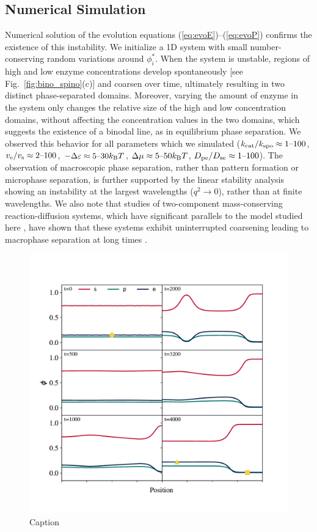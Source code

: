 \subsection{Numerical Simulation}

Numerical solution of the evolution equations (\ref{eq:evoE})--(\ref{eq:evoP}) confirms the existence of this instability. We initialize a 1D system
with small number-conserving random variations around $\phi_i^*$. When the system is unstable, regions of high and low enzyme concentrations develop spontaneously [see Fig.~\ref{fig:bino_spino}(c)] and coarsen over time, ultimately resulting in two distinct phase-separated domains. Moreover, varying the amount of enzyme in the system only changes the relative size of the high and low concentration domains, without affecting the concentration values in the two domains, which suggests the existence of a binodal line, as in equilibrium phase separation. We observed this behavior for all parameters which we simulated ($k_{\mathrm{cat}}/k_{\mathrm{spo}}\approx 1 \text{--} 100$, $v_{\mathrm{e}}/v_{\mathrm{s}}\approx 2 \text{--} 100$, $-\Delta \varepsilon\approx 5 \text{--} 30 k_{\rm B} T$, $\Delta \mu\approx5 \text{--} 50k_{\rm B} T$,  $D_{\mathrm{pe}}/D_{\mathrm{se}}\approx1 \text{--} 100$). The observation of macroscopic phase separation, rather than pattern formation or microphase separation, is further supported by the linear stability analysis showing an instability at the largest wavelengths ($q^2 \to 0$), rather than at finite wavelengths. We also note that studies of two-component mass-conserving reaction-diffusion systems, which have significant parallels to the model studied here \cite{suppmat}, have shown that these systems exhibit uninterrupted coarsening leading to macrophase separation at long times \cite{brauns2020phase,brauns2021wavelength}.

\begin{figure}
    \centering
    \includegraphics[width=\textwidth]{figures/CIPSnumeric.pdf}
    \caption{Caption}
    \label{fig:phase_sep_scheme}
\end{figure}

